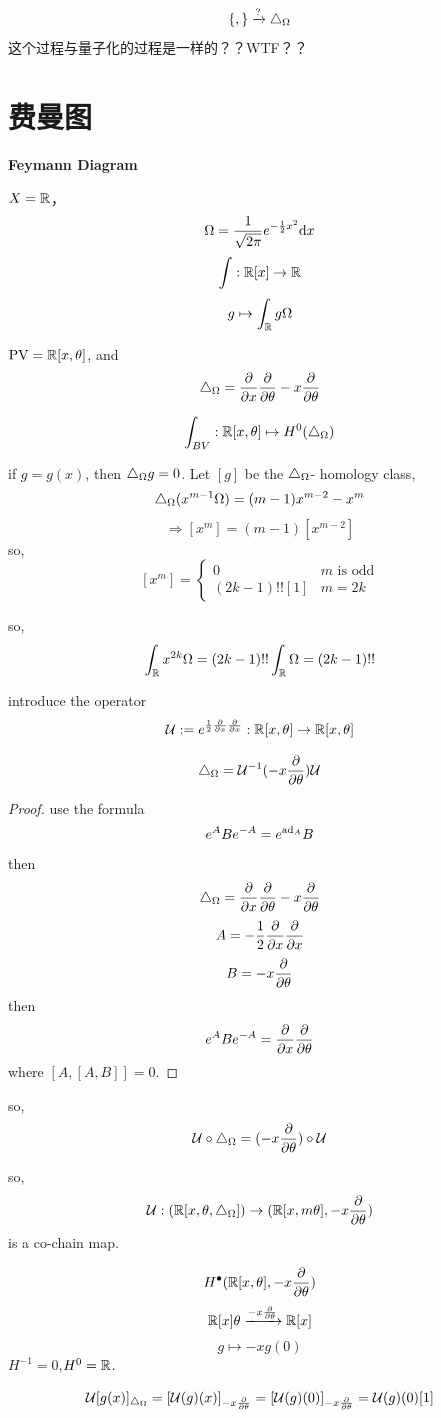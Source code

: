 $$\{,\}\xrightarrow{?}\triangle_{\Omega}$$
这个过程与量子化的过程是一样的？？WTF？？

\section{费曼图}
\textbf{Feymann Diagram}
\begin{example}
$X=\mathbb{R}$，
$$\Omega=\frac{1}{\sqrt{2\pi}}e^{-\frac{1}{2}x^2}\mathrm{d} x$$
$$\int:\mathbb{R}[x]\to\mathbb{R}$$
$$g\mapsto\int_{\mathbb{R}}g\Omega$$

$\operatorname{PV}=\mathbb{R}[x,\theta]$, and
$$\triangle_{\Omega}=\frac{\partial } {\partial x}\frac{\partial } {\partial \theta}-x\frac{\partial } {\partial \theta}$$

$$\int_{BV}:\mathbb{R}[x,\theta]\mapsto H^0(\triangle_{\Omega})$$

if $g=g(x)$, then $\triangle_{\Omega}g=0$. Let $[g]$ be the
$\triangle_{\Omega}$- homology class,
$$\triangle_{\Omega}(x^{m-1}\Omega)
=(m-1)x^{m-2}
-x^m$$
$$\Rightarrow [x^m]=(m-1)[x^{m-2}]$$
so,
$$
[x^m]=
\left\{
  \begin{array}{cc}
    0  &  m \text{ is odd}\\
    (2k-1)!![1]  & m=2k
  \end{array}
\right.
$$

so,
$$\int_{\mathbb{R}}x^{2k}\Omega=
(2k-1)!!\int_{\mathbb{R}}\Omega=(2k-1)!!$$

\end{example}

introduce the operator
$$\mathcal{U}:=
  e^{\frac{1}{2}\frac{\partial } {\partial x}\frac{\partial } {\partial x}}:
  \mathbb{R}[x,\theta]\to\mathbb{R}[x,\theta]
$$

\begin{lemma}
$$\triangle_{\Omega}=\mathcal{U}^{-1}(-x\frac{\partial } {\partial \theta})\mathcal{U}$$
\end{lemma}
\begin{proof}
use the formula
$$e^ABe^{-A}=e^{\operatorname{ad}_A}B$$
then
$$\triangle_{\Omega}=\frac{\partial } {\partial x}\frac{\partial } {\partial \theta}-x\frac{\partial } {\partial \theta}
$$
$$A=-\frac{1}{2}\frac{\partial } {\partial x}\frac{\partial } {\partial x}$$
$$B=-x\frac{\partial } {\partial \theta}$$
then
$$e^ABe^{-A}=\frac{\partial } {\partial x}\frac{\partial } {\partial \theta}$$
where $[A,[A,B]]=0$.
\end{proof}

so,
$$\mathcal{U}\circ\triangle_{\Omega}=(-x\frac{\partial } {\partial \theta})\circ\mathcal{U}$$

so,
$$\mathcal{U}:(\mathbb{R}[x,\theta,\triangle_{\Omega}])\to
(\mathbb{R}[x,m\theta],-x\frac{\partial } {\partial \theta})$$
is a co-chain map.

$$H^{\bullet}(\mathbb{R}[x,\theta],-x\frac{\partial } {\partial \theta})$$
$$\mathbb{R}[x]\theta\xrightarrow{-x\frac{\partial } {\partial \theta}}\mathbb{R}[x]$$
$$g\mapsto -xg(0)$$
$H^{-1}=0$,$H^0=\mathbb{R}$.

$$\mathcal{U}[g(x)]_{\triangle_{\Omega}}=[\mathcal{U}(g)(x)]_{-x\frac{\partial } {\partial \theta}}
=[\mathcal{U}(g)(0)]_{-x\frac{\partial } {\partial \theta}}
=\mathcal{U}(g)(0)[1]$$

